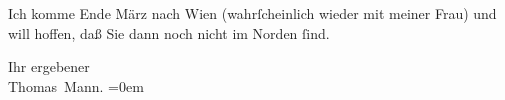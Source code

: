 \pstart
           Ich komme Ende März nach Wien (wahrſcheinlich
               wieder mit meiner Frau) und
               will hoffen, daß Sie dann noch nicht im Norden{ }ſind.\pend
           
\pstart
           Ihr ergebener{\\[\baselineskip]}\spacefill\mbox{Thomas Mann.}\pend
           \leftskip=0em{}\endnumbering{}  \newcommand{\dateiname}{L02397}\newcommand{\titel}{Thomas Mann an Arthur Schnitzler, 20. 2. 1923}\newcommand{\editorInnen}{Martin Anton Müller und Gerd-Hermann Susen}
